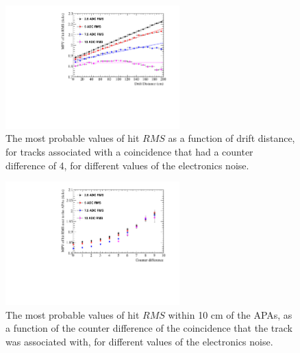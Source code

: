 \begin{figure}
  \centering
  \includegraphics[width=0.6\textwidth]{Canvas_CountDiff4_All_Positions_NoiseLevel}
  \caption[The most probable values of hit $RMS$ as a function of drift distance, for tracks associated with a coincidence that had a counter difference of 4, for different values of the electronics noise]
          {The most probable values of hit $RMS$ as a function of drift distance, for tracks associated with a coincidence that had a counter difference of 4, for different values of the electronics noise.}
  \label{fig:DiffNoiseStudy_CDiff4}
\end{figure}

\begin{figure}
  \centering
  \includegraphics[width=0.6\textwidth]{Canvas_All_Angles_RMS0cm_NoiseLevel}
  \caption[The angular dependence of hits within 10 cm of the APAs, for different values of the electronics noise]
          {The most probable values of hit $RMS$ within 10 cm of the APAs, as a function of the counter difference of the coincidence that the track was associated with, for different values of the electronics noise.}
  \label{fig:DiffNoiseStudy_RMS0cm}
\end{figure}


